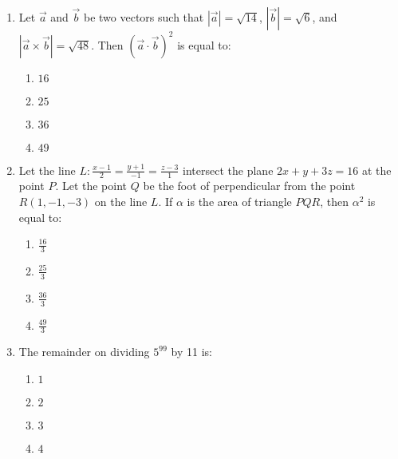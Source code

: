\documentclass[journal]{IEEEtran}
\newcommand{\brak}[1]{\left( #1 \right)}
\newcommand{\abs}[1]{\left| #1 \right|}
\begin{document}
\begin{enumerate}
        \begin{multicols}{4}
        \begin{enumerate}
        \item $10$
        \item $2$
        \item $14$
        \item $16$
        \end{enumerate}
        \end{multicols}

    \item Let $\vec{a}$ and $\vec{b}$ be two vectors such that $\abs{\vec{a}}=\sqrt{14}$, $\abs{\vec{b}}=\sqrt{6}$, and $\abs{\vec{a}\times\vec{b}}=\sqrt{48}$. Then $\brak{\vec{a}\cdot\vec{b}}^{2}$ is equal to:

        \begin{multicols}{4}
        \begin{enumerate}
        \item $16$
        \item $25$
        \item $36$
        \item $49$
        \end{enumerate}
        \end{multicols}

    \item Let the line $L:\frac{x-1}{2}=\frac{y+1}{-1}=\frac{z-3}{1}$ intersect the plane $2x+y+3z=16$ at the point $P$. Let the point $Q$ be the foot of perpendicular from the point $R\brak{1,-1,-3}$ on the line $L$. If $\alpha$ is the area of triangle $PQR$, then $\alpha^{2}$ is equal to:

        \begin{multicols}{4}
        \begin{enumerate}
        \item $\frac{16}{3}$
        \item $\frac{25}{3}$
        \item $\frac{36}{3}$
        \item $\frac{49}{3}$
        \end{enumerate}
        \end{multicols}

    \item The remainder on dividing $5^{99}$ by 11 is:

        \begin{multicols}{4}
        \begin{enumerate}
        \item $1$
        \item $2$
        \item $3$
        \item $4$
        \end{enumerate}
        \end{multicols}
        

\end{enumerate}
\end{document}

